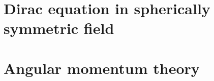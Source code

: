 \documentclass  [
  paper           = a4,
  BCOR            = 13mm, %
  twoside,
  fontsize        = 11pt, %
  DIV             = 12,   %
  chapterprefix,
  numbers         = noendperiod,
  headinclude     = true,
  footinclude     = false,
  headings        = big,
  headings        = openright,
  headsepline     = true,
  footsepline     = false,
  cleardoublepage = empty,
  titlepage       = true
]                                       {scrbook}
\begin{document}


  
  

  \frontmatter

  \tableofcontents
    \thispagestyle{plain}

  \mainmatter

  \cleardoublepage
  

  
  
  
  
  
  
  
  
   
  
   
  

  \cleardoublepage
  



  \cleardoublepage
  \appendix


  \chapter{Dirac equation in spherically symmetric field \label{app:dir_sph}}
    
    
  \chapter{Angular momentum theory \label{app:ang_theo}}
    
  
\end{document}
